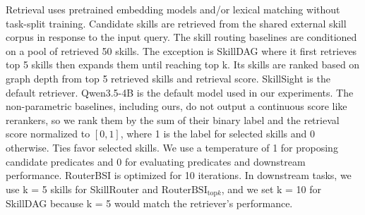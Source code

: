 Retrieval uses pretrained embedding models and/or lexical matching without task-split training. Candidate skills are retrieved from the shared external skill corpus in response to the input query. The skill routing baselines are conditioned on a pool of retrieved 50 skills. The exception is SkillDAG where it first retrieves top 5 skills then expands them until reaching top k. Its skills are ranked based on graph depth from top 5 retrieved skills and retrieval score. SkillSight is the default retriever. Qwen3.5-4B is the default model used in our experiments. The non-parametric baselines, including ours, do not output a continuous score like rerankers, so we rank them by the sum of their binary label and the retrieval score normalized to $[0,1]$, where 1 is the label for selected skills and 0 otherwise. Ties favor selected skills. We use a temperature of 1 for proposing candidate predicates and 0 for evaluating predicates and downstream performance. RouterBSI is optimized for 10 iterations. In downstream tasks, we use k = 5 skills for SkillRouter and $\mathrm{RouterBSI}_{\mathrm{top}k}$, and we set k = 10 for SkillDAG because k = 5 would match the retriever's performance.

\afterpage{%
\begingroup
\let\resultstopfigure\figure
\renewcommand{\figure}[1][]{\resultstopfigure[!ht]}

\endgroup
\begingroup
\expandafter\let\expandafter\resultsbottomfigure\csname figure*\endcsname
\expandafter\let\expandafter\endresultsbottomfigure\csname endfigure*\endcsname
\renewenvironment{figure}[1][]{\resultsbottomfigure[!b]}{\endresultsbottomfigure}

\endgroup
}


